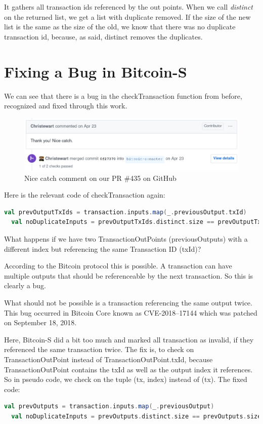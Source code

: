 It gathers all transaction ids referenced by the out points.
When we call \emph{distinct} on the returned list, we get a list with duplicate removed.
If the size of the new list is the same as the size of the old, we know that there was no duplicate transaction id, because, as said, distinct removes the duplicates.


\section{Fixing a Bug in Bitcoin-S}
\label{sec:bugfix}

We can see that there is a bug in the checkTransaction function from before, recognized and fixed through this work.

\begin{figure}[H]
	\centering
		\includegraphics[scale=0.5]{images/bitcoin-s-pr-comment.png}
	\caption{Nice catch comment on our PR \#435 on GitHub}
	\label{fig:output1}
\end{figure}

Here is the relevant code of checkTransaction again:
\begin{lstlisting}[language=scala]
  val prevOutputTxIds = transaction.inputs.map(_.previousOutput.txId)
  val noDuplicateInputs = prevOutputTxIds.distinct.size == prevOutputTxIds.size
\end{lstlisting}

What happens if we have two TransactionOutPoints (previousOutputs) with a different index but referencing the same Transaction ID (txId)?

According to the Bitcoin protocol this is possible.
A transaction can have multiple outputs that should be referenceable by the next transaction.
So this is clearly a bug.

What should not be possible is a transaction referencing the same output twice.
This bug occurred in Bitcoin Core known as CVE-2018–17144 which was patched on September 18, 2018. \cite{cve201817144}

Here, Bitcoin-S did a bit too much and marked all transaction as invalid, if they referenced the same transaction twice.
The fix is, to check on TransactionOutPoint instead of TransactionOutPoint.txId, because TransactionOutPoint contains the txId as well as the output index it references.
So in pseudo code, we check on the tuple (tx, index) instead of (tx).
The fixed code:
\begin{lstlisting}[language=scala]
  val prevOutputs = transaction.inputs.map(_.previousOutput)
  val noDuplicateInputs = prevOutputs.distinct.size == prevOutputs.size
\end{lstlisting}

